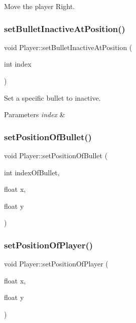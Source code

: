Move the player Right. 

\mbox{\label{class_player_a4a72b5ba696e55375ee614ef89a87ade}} 
\subsubsection{\texorpdfstring{set\+Bullet\+Inactive\+At\+Position()}{setBulletInactiveAtPosition()}}
{\footnotesize\ttfamily void Player\+::set\+Bullet\+Inactive\+At\+Position (\begin{DoxyParamCaption}\item[{int}]{index }\end{DoxyParamCaption})}



Set a specific bullet to inactive. 


\begin{DoxyParams}{Parameters}
{\em index} & \\
\hline
\end{DoxyParams}
\mbox{\label{class_player_a3bf9c265d1be1284501b8c03ca5bdfb0}} 
\subsubsection{\texorpdfstring{set\+Position\+Of\+Bullet()}{setPositionOfBullet()}}
{\footnotesize\ttfamily void Player\+::set\+Position\+Of\+Bullet (\begin{DoxyParamCaption}\item[{int}]{index\+Of\+Bullet,  }\item[{float}]{x,  }\item[{float}]{y }\end{DoxyParamCaption})\hspace{0.3cm}{\ttfamily [inline]}}

\mbox{\label{class_player_abeaa59ae6cd6ca74f269f4af28ef8f82}} 
\subsubsection{\texorpdfstring{set\+Position\+Of\+Player()}{setPositionOfPlayer()}}
{\footnotesize\ttfamily void Player\+::set\+Position\+Of\+Player (\begin{DoxyParamCaption}\item[{float}]{x,  }\item[{float}]{y }\end{DoxyParamCaption})\hspace{0.3cm}{\ttfamily [inline]}}

